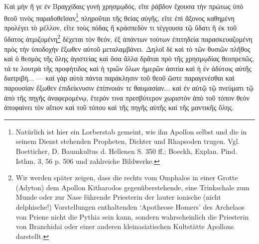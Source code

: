 \documentclass[a4paper, 11pt, oneside]{article}
\begin{document}
Καὶ μὴν ἥ γε ἐν Βραγχίδαις γυνὴ χρησμῳδός, εἴτε ῥάβδον ἔχουσα τὴν πρώτως ὑπὸ θεοῦ τινὸς παραδοθεῖσαν\footnote{Natürlich ist hier ein Lorberstab gemeint, wie ihn Apollon selbst und die in seinem Dienst stehenden Propheten, Dichter und Rhapsoden trugen. Vgl. Boetticher, D. Baumkultus d. Hellenen S. 350 ff.; Boeckh, Explan. Pind. Isthm. 3, 56 p. 506 und zahlreiche Bildwerke.} πληροῦται τῆς θείας αὐγῆς, εἴτε ἐπὶ ἄξονος καθημένη προλέγει τὸ μέλλον, εἴτε τοὺς πόδας ἢ κράσπεδόν τι τέγγουσα τῷ ὕδατι ἢ ἐκ τοῦ ὕδατος ἁτμιζομένη\footnote{Wir werden später zeigen, dass die rechts vom Omphalos in einer Grotte (Adyton) dem Apollon Kitharodos gegenüberstehende, eine Trinkschale zum Munde oder zur Nase führende Priesterin der lauter ionische (nicht delphische!) Vorstellungen enthaltenden `Apotheose Homers' des Archelaos von Priene nicht die Pythia sein kann, sondern wahrscheinlich die Priesterin von Branchidai oder einer anderen kleinasiatischen Kultstätte Apollons darstellt.} δέχεται τὸν θεόν, ἐξ ἁπάντων τούτων ἐπιτηδεία παρασκευαζομένη πρὸς τὴν ὑποδοχὴν ἔξωθεν αὐτοῦ μεταλαμβάνει. Δηλοῖ δὲ καὶ τὸ τῶν θυσιῶν πλῆθος καὶ ὁ θεσμὸς τῆς ὅλης ἁγιστείας καὶ ὅσα ἄλλα δρᾶται πρὸ τῆς χρησμῳδίας θεοπρεπῶς, τά τε λουτρὰ τῆς προφήτιδος καὶ ἡ τριῶν ὅλων ἡμερῶν ἀσιτία καὶ ἡ ἐν ἀδύτοις αὐτῆς διατριβὴ... --- καὶ γὰρ αὐτὰ πάντα παράκλησιν τοῦ θεοῦ ὥστε παραγενέσθαι καὶ παρουσίαν ἔξωθεν ἐπιδείκνυσιν ἐπίπνοιάν τε θαυμασίαν... καὶ ἐν αὐτῷ τῷ πνεύματι τῷ ἀπὸ τῆς πηγῆς ἀναφερομένῳ, ἕτερόν τινα πρεσβύτερον χωριστὸν ἀπὸ τοῦ τόπον θεὸν ἀποφαίνει τὸν αἴτιον καὶ τοῦ τόπου καὶ τῆς πηγῆς αὐτῆς καὶ τῆς μαντικῆς ὅλης.
\end{document}
